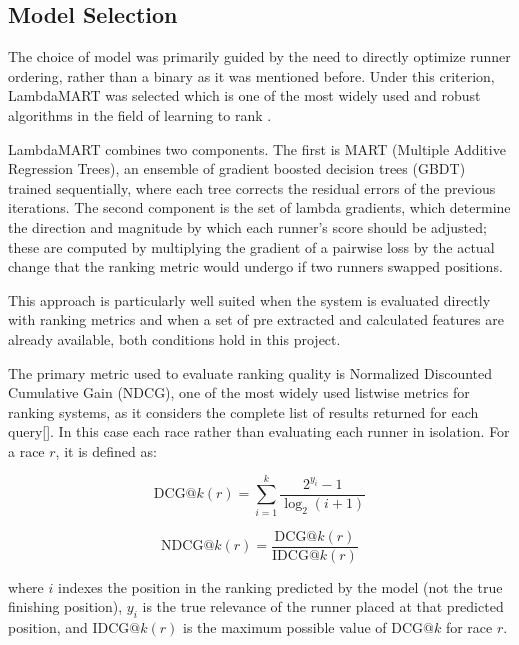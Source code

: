 \subsection{Model Selection}

The choice of model was primarily guided by the need to directly optimize runner ordering, rather than a binary as it was mentioned before. Under this criterion, LambdaMART was selected which is one of the most widely used and robust algorithms in the field of learning to rank \cite{harshini2026learning}.

LambdaMART combines two components. The first is MART (Multiple Additive Regression Trees), an ensemble of gradient boosted decision trees (GBDT) trained sequentially, where each tree corrects the residual errors of the previous iterations\cite{10.1145/3308558.3313447}. The second component is the set of lambda gradients, which determine the direction and magnitude by which each runner's score should be adjusted; these are computed by multiplying the gradient of a pairwise loss by the actual change that the ranking metric would undergo if two runners swapped positions\cite{10.1145/3308558.3313447}.

This approach is particularly well suited when the system is evaluated directly with ranking metrics and when a set of pre extracted and calculated features are already available, both conditions hold in this project.

The primary metric used to evaluate ranking quality is Normalized Discounted Cumulative Gain (NDCG), one of the most widely used listwise metrics for ranking systems, as it considers the complete list of results returned for each query[\cite{harshini2026learning}]. In this case each race rather than evaluating each runner in isolation. For a race $r$, it is defined as:

\begin{equation}
\text{DCG@}k(r) = \sum_{i=1}^{k} \frac{2^{y_i} - 1}{\log_2(i+1)}
\end{equation}

\begin{equation}
\text{NDCG@}k(r) = \frac{\text{DCG@}k(r)}{\text{IDCG@}k(r)}
\end{equation}

where $i$ indexes the position in the ranking predicted by the model (not the true finishing position), $y_i$ is the true relevance of the runner placed at that predicted position, and $\text{IDCG@}k(r)$ is the maximum possible value of $\text{DCG@}k$ for race $r$.   

